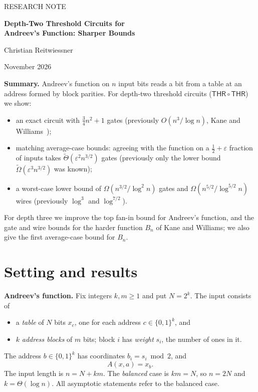 \documentclass[11pt,letterpaper]{article}
\newcommand{\bits}{\{0,1\}}
\newcommand{\sect}[1]{\section{\color{ink}#1}}
\newcommand{\smalltitle}[1]{\textbf{\color{ink}#1}\quad}
\newcommand{\THR}{\mathsf{THR}}
\begin{document}
\thispagestyle{empty}
{\color{accent}\small RESEARCH NOTE\par}
\vspace{0.4em}
{\raggedright\color{ink}\LARGE\bfseries Depth-Two Threshold Circuits for\\[0.15em]
Andreev's Function: Sharper Bounds\par}
\vspace{0.5em}
{\large Christian Reitwiessner\par}
{\small November 2026\par}
\vspace{0.8em}

\begin{keybox}
\textbf{Summary.} Andreev's function on $n$ input bits reads a bit from a
table at an address formed by block parities. For depth-two threshold
circuits ($\THR\circ\THR$) we show:
\begin{itemize}
\item an exact circuit with $\tfrac34 n^2+1$ gates (previously
      $O(n^3/\log n)$, Kane and Williams~\cite{KW});
\item matching average-case bounds: agreeing with the function on a
      $\tfrac12+\varepsilon$ fraction of inputs takes
      $\tilde\Theta(\varepsilon^2 n^{3/2})$ gates (previously only the lower
      bound $\tilde\Omega(\varepsilon^3 n^{3/2})$ was known);
\item a worst-case lower bound of $\Omega(n^{3/2}/\log^2 n)$ gates and
      $\Omega(n^{5/2}/\log^{5/2}n)$ wires (previously $\log^3$ and
      $\log^{7/2}$).
\end{itemize}
For depth three we improve the top fan-in bound for Andreev's function, and
the gate and wire bounds for the harder function $B_n$ of Kane and Williams;
we also give the first average-case bound for $B_n$.
\end{keybox}

\sect{Setting and results}

\smalltitle{Andreev's function.}
Fix integers $k,m\ge1$ and put $N=2^k$. The input consists of
\begin{itemize}
\item a \emph{table} of $N$ bits $x_c$, one for each address $c\in\bits^k$, and
\item $k$ \emph{address blocks} of $m$ bits; block $i$ has \emph{weight}
      $s_i$, the number of ones in it.
\end{itemize}
The address $b\in\bits^k$ has coordinates $b_i=s_i\bmod2$, and
\[
A(x,a)=x_b .
\]
The input length is $n=N+km$. The \emph{balanced} case is $km=N$, so $n=2N$
and $k=\Theta(\log n)$. All asymptotic statements refer to the balanced case.
\end{document}
